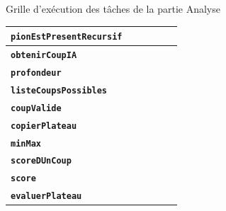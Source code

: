\documentclass{beamer}
\begin{document}
\begin{frame}[label=analyse]
\begin{alertblock}{Grille d’exécution des tâches de la partie Analyse}
{\begin{table}[h]
\begin{center}
\begin{tabular}{|l|c|c|c|c|c|}
 		\textbf{\texttt{pionEstPresentRecursif}} & \cellcolor{lightgray} & \cellcolor{lightgray} & \cellcolor{lightgray} & & \\\hline
 		\textbf{\texttt{obtenirCoupIA}} & & & &  \cellcolor{lightgray}&  \cellcolor{lightgray}  \\\hline
 		 		\textbf{\texttt{profondeur}} & & & &  \cellcolor{lightgray}&  \cellcolor{lightgray}  \\\hline
 		 		 		\textbf{\texttt{listeCoupsPossibles}} & & & &  \cellcolor{lightgray}&  \cellcolor{lightgray}  \\\hline
 		  		\textbf{\texttt{coupValide}} & & & &  \cellcolor{lightgray}&  \cellcolor{lightgray}  \\\hline
  		\textbf{\texttt{copierPlateau}} & & & &  \cellcolor{lightgray}&  \cellcolor{lightgray}  \\\hline
   		\textbf{\texttt{minMax}} & & & &  \cellcolor{lightgray}&  \cellcolor{lightgray}  \\\hline
   		 		\textbf{\texttt{scoreDUnCoup}} & & & &  \cellcolor{lightgray}&  \cellcolor{lightgray}  \\\hline
   	 		\textbf{\texttt{score}} & & & &  \cellcolor{lightgray}&  \cellcolor{lightgray}  \\\hline
   	 		 		\textbf{\texttt{evaluerPlateau}} & & & &  \cellcolor{lightgray}&  \cellcolor{lightgray}  \\\hline
\end{tabular}
\end{center}
\end{table}}
	\end{alertblock}
	\end{frame}
	
\end{document}
